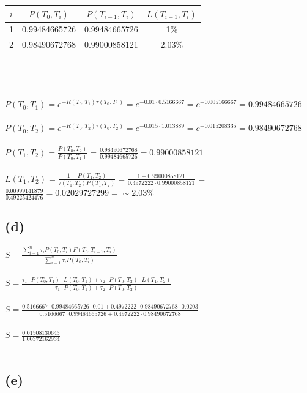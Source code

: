\documentclass{article}
\begin{document}
{\begin{tabular}{ | c | c | c | c |}
	\hline
		$i$ & $P(T_0, T_i)$ & $P(T_{i-1}, T_i)$ & $L(T_{i-1}, T_i)$ \\
  \hline
		1 & 0.99484665726 & 0.99484665726 & 1\% \\
  \hline
		2 & 0.98490672768 & 0.99000858121 & 2.03\% \\
	\hline
\end{tabular} \\ \\ \\
$P(T_0, T_1) = e^{-R(T_0, T_1)\tau(T_0, T_1)} = e^{-0.01 \cdot 0.5166667} = e^{-0.005166667} = 0.99484665726$ \\ \\
$P(T_0, T_2) = e^{-R(T_0, T_2)\tau(T_0, T_2)} = e^{-0.015 \cdot 1.013889} = e^{-0.015208335} = 0.98490672768$ \\ \\
$P(T_1, T_2) = \frac{P(T_0, T_2)}{P(T_0, T_1)} = \frac{0.98490672768}{0.99484665726} = 0.99000858121$ \\ \\
$L(T_1, T_2) = \frac{1 - P(T_1, T_2)}{\tau(T_1, T_2) P(T_1, T_2)} = \frac{1 - 0.99000858121}{0.4972222 \cdot 0.99000858121}$ = $\frac{0.00999141879}{0.49225424476} = 0.02029727299 = \sim 2.03\%$

\subsection*{(d)}

$S = \frac{\sum_{i=1}^{n} \tau_i P(T_0, T_i) F(T_0; T_{i-1}, T_i)}{\sum_{i=1}^{n} \tau_i P(T_0, T_i)}$ \\ \\
$S = \frac{\tau_1 \cdot P(T_0, T_1) \cdot L(T_0, T_1) + \tau_2 \cdot P(T_0, T_2) \cdot L(T_1, T_2)}{\tau_1 \cdot P(T_0, T_1) + \tau_2 \cdot P(T_0, T_2)}$ \\ \\ 
$S = \frac{0.5166667 \cdot 0.99484665726 \cdot 0.01 + 0.4972222 \cdot 0.98490672768 \cdot 0.0203}{0.5166667 \cdot 0.99484665726 + 0.4972222 \cdot 0.98490672768}$ \\ \\
$S = \frac{0.01508130643}{1.00372162934}$ \\ \\

\subsection*{(e)}

}
\end{document}
